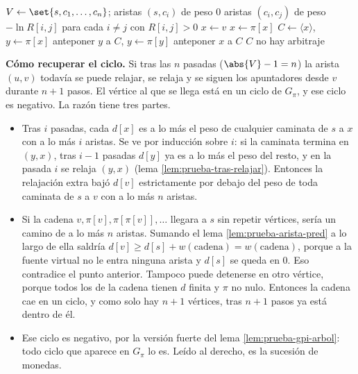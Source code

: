 \documentclass[11pt,letterpaper]{article}
\begin{document}
\begin{algorithm}[H]
\caption{\textsc{Arbitraje}$(R, n)$}
\label{alg:caminos-arbitraje}
\begin{algorithmic}[1]
  \State $V \gets \set{s, c_1, \dots, c_n}$; aristas $(s, c_i)$ de
         peso $0$
  \State aristas $(c_i, c_j)$ de peso $-\ln R[i, j]$ para cada
         $i \ne j$ con $R[i, j] > 0$
  \State {}
   
      \State {}
    \EndFor
  \EndFor
      \State {}
      \State $x \gets v$
        \State $x \gets \pi[x]$ 
      \EndFor
      \State $C \gets \langle x \rangle$, \quad $y \gets \pi[x]$
        \State anteponer $y$ a $C$, \quad $y \gets \pi[y]$
      \EndWhile
      \State anteponer $x$ a $C$
      \State \Return $C$ 
    \EndIf
  \EndFor
  \State \Return no hay arbitraje
\EndProcedure
\end{algorithmic}
\end{algorithm}

\textbf{Cómo recuperar el ciclo.} Si tras las $n$ pasadas
($\abs{V} - 1 = n$) la arista $(u, v)$ todavía se puede relajar, se
relaja y se siguen los apuntadores desde $v$ durante $n + 1$ pasos. El
vértice al que se llega está en un ciclo de $G_\pi$, y ese ciclo es
negativo. La razón tiene tres partes.
\begin{itemize}
  \item Tras $i$ pasadas, cada $d[x]$ es a lo más el peso de cualquier
    caminata de $s$ a $x$ con a lo más $i$ aristas. Se ve por
    inducción sobre $i$: si la caminata termina en $(y, x)$, tras
    $i - 1$ pasadas $d[y]$ ya es a lo más el peso del resto, y en la
    pasada $i$ se relaja $(y, x)$ (lema \ref{lem:prueba-tras-relajar}).
    Entonces la relajación extra bajó $d[v]$ estrictamente por debajo
    del peso de toda caminata de $s$ a $v$ con a lo más $n$ aristas.
  \item Si la cadena $v, \pi[v], \pi[\pi[v]], \dots$ llegara a $s$
    sin repetir vértices, sería un camino de a lo más $n$ aristas.
    Sumando el lema \ref{lem:prueba-arista-pred} a lo largo de ella
    saldría $d[v] \ge d[s] + w(\text{cadena}) = w(\text{cadena})$,
    porque a la fuente virtual no le entra ninguna arista y $d[s]$ se
    queda en $0$. Eso contradice el punto anterior. Tampoco puede
    detenerse en otro vértice, porque todos los de la cadena tienen
    $d$ finita y $\pi$ no nulo. Entonces la cadena cae en un ciclo, y
    como solo hay $n + 1$ vértices, tras $n + 1$ pasos ya está dentro
    de él.
  \item Ese ciclo es negativo, por la versión fuerte del lema
    \ref{lem:prueba-gpi-arbol}: todo ciclo que aparece en $G_\pi$ lo
    es. Leído al derecho, es la sucesión de monedas.
\end{itemize}
\end{document}
